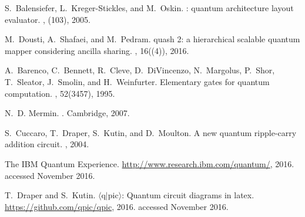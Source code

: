 \documentclass[USenglish,12pt,fleqn]{article} %
\begin{document}
\begin{thebibliography}{10}
S.~Balensiefer, L.~Kreger-Stickles, and M.~Oskin.
: quantum architecture layout evaluator.
,
  (103), 2005.

M.~Dousti, A.~Shafaei, and M.~Pedram.
quash 2: a hierarchical scalable quantum mapper considering
  ancilla sharing.
, 16((4)), 2016.

A.~Barenco, C.~Bennett, R.~Cleve, D.~DiVincenzo, N.~Margolus, P.~Shor,
  T.~Sleator, J.~Smolin, and H.~Weinfurter.
\newblock Elementary gates for quantum computation.
, 52(3457), 1995.

N.~D. Mermin.
.
\newblock Cambridge, 2007.

S.~Cuccaro, T.~Draper, S.~Kutin, and D.~Moulton.
\newblock A new quantum ripple-carry addition circuit.
, 2004.

The {IBM} {Q}uantum {E}xperience.
\newblock \url{http://www.research.ibm.com/quantum/}, 2016.
\newblock accessed November 2016.

T.~Draper and S.~Kutin.
\newblock $\langle\mathrm{q}|\mathrm{pic}\rangle$: Quantum circuit diagrams in
  latex.
\newblock \url{https://github.com/qpic/qpic}, 2016.
\newblock accessed November 2016.

\end{thebibliography}
\end{document}
